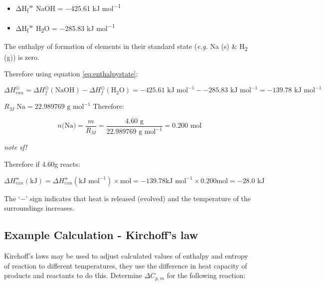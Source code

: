 \documentclass[
]{book}
\providecommand{\tightlist}{%
  \setlength{\itemsep}{0pt}\setlength{\parskip}{0pt}}
\begin{document}
\begin{itemize}
\tightlist
\item
  ΔH\textsubscript{f}\textsuperscript{⦵} NaOH = −425.61 kJ mol\textsuperscript{−1}
\item
  ΔH\textsubscript{f}\textsuperscript{⦵} H\textsubscript{2}O = −285.83 kJ mol\textsuperscript{−1}
\end{itemize}

The enthalpy of formation of elements in their standard state (\emph{e.g.} Na (s) \& H\textsubscript{2} (g)) is zero.

Therefore using equation \eqref{eq:enthalpystate}:

\begin{equation*}
\Delta H_{rxn}^{\ominus}= \Delta H_{f}^{\ominus}(\textrm{NaOH})-\Delta H_{f}^{\ominus}(\textrm{H}_2\textrm{O})= −425.61 \textrm{ kJ mol}^{−1} − −285.83 \textrm{ kJ mol}^{−1} = −139.78 \textrm{ kJ mol}^{−1}
\end{equation*}

\(R_M \textrm{ Na} = 22.989769 \textrm{ g mol}^{−1}\)
Therefore:

\begin{equation*}
n \textrm{(Na)} = \frac{m}{R_M} = \frac{4.60 \textrm{ g}}{ 22.989769 \textrm{ g mol}^{−1}} = 0.200 \textrm{ mol}
\end{equation*}

\emph{note sf!}

Therefore if 4.60g reacts:

\begin{equation*}
\Delta H_{rxn}^⦵ ( \textrm{kJ}) = \Delta H_{rxn}^⦵ ( \textrm{kJ mol}^{−1}) × \textrm{mol} = −139.78 \textrm{kJ mol}^{-1} × 0.200 \textrm{mol} = −28.0 \textrm{ kJ}
\end{equation*}

The `−' sign indicates that heat is released (evolved) and the temperature of the surroundings increases.

\hypertarget{subsec:examplekirchoff}{%
\subsection{Example Calculation - Kirchoff's law}\label{subsec:examplekirchoff}}

Kirchoff's laws may be used to adjust calculated values of enthalpy and entropy of reaction to different temperatures, they use the difference in heat capacity of products and reactants to do this. Determine \(ΔC_{p,m}\) for the following reaction:
\end{document}
